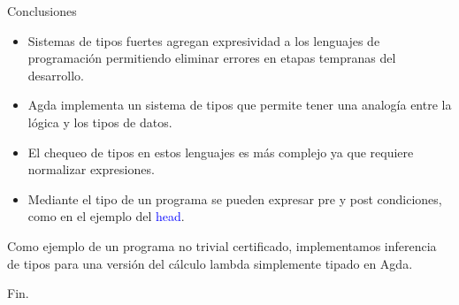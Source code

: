 \documentclass[xcolor=dvipsnames]{beamer} %
\newcommand{\cf}[1]{\textcolor{blue}{#1}}
\begin{document}
\begin{frame}
 
 \begin{block}{Conclusiones}
  \begin{itemize}
  \pause
  
   \item Sistemas de tipos fuertes agregan expresividad a los lenguajes de programación
    permitiendo eliminar errores en etapas tempranas del desarrollo.
    
   \pause
    
   \item Agda implementa un sistema de tipos que permite tener una analogía entre la lógica y los 
   tipos de datos.
   
   \pause
   
   \item El chequeo de tipos en estos lenguajes es más complejo ya que requiere normalizar expresiones.
   
   \pause
   
   \item Mediante el tipo de un programa se pueden expresar pre y post condiciones, como en el ejemplo
   del \cf{head}.
  \end{itemize}

 \end{block}

 \pause
 
 \begin{block}{}
  Como ejemplo de un programa no trivial certificado, implementamos inferencia de tipos para una versión del cálculo
  lambda simplemente tipado en Agda.
 \end{block}

 
\end{frame}

\begin{frame}{}
\begin{center}
 \Huge Fin.
\end{center}
\end{frame}
\end{document}
